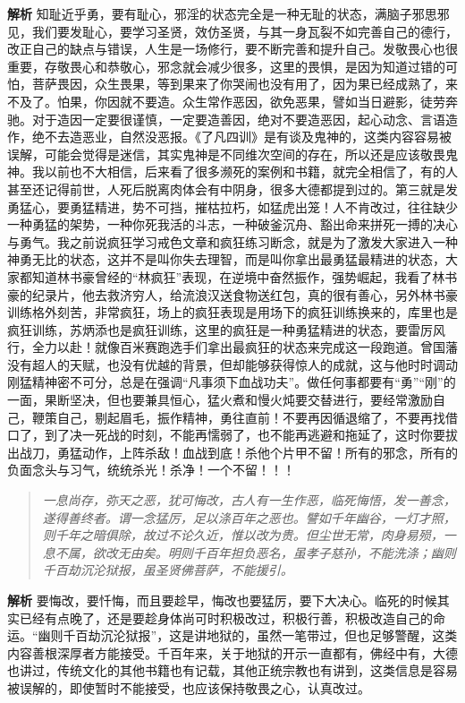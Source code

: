 \textbf{解析} 知耻近乎勇，要有耻心，邪淫的状态完全是一种无耻的状态，满脑子邪思邪见，我们要发耻心，要学习圣贤，效仿圣贤，与其一身瓦裂不如完善自己的德行，改正自己的缺点与错误，人生是一场修行，要不断完善和提升自己。发敬畏心也很重要，存敬畏心和恭敬心，邪念就会减少很多，这里的畏惧，是因为知道过错的可怕，菩萨畏因，众生畏果，等到果来了你哭闹也没有用了，因为果已经成熟了，来不及了。怕果，你因就不要造。众生常作恶因，欲免恶果，譬如当日避影，徒劳奔驰。对于造因一定要很谨慎，一定要造善因，绝对不要造恶因，起心动念、言语造作，绝不去造恶业，自然没恶报。《了凡四训》是有谈及鬼神的，这类内容容易被误解，可能会觉得是迷信，其实鬼神是不同维次空间的存在，所以还是应该敬畏鬼神。我以前也不大相信，后来看了很多濒死的案例和书籍，就完全相信了，有的人甚至还记得前世，人死后脱离肉体会有中阴身，很多大德都提到过的。第三就是发勇猛心，要勇猛精进，势不可挡，摧枯拉朽，如猛虎出笼！人不肯改过，往往缺少一种勇猛的架势，一种你死我活的斗志，一种破釜沉舟、豁出命来拼死一搏的决心与勇气。我之前说疯狂学习戒色文章和疯狂练习断念，就是为了激发大家进入一种神勇无比的状态，这并不是叫你失去理智，而是叫你拿出最勇猛最精进的状态，大家都知道林书豪曾经的“林疯狂”表现，在逆境中奋然振作，强势崛起，我看了林书豪的纪录片，他去救济穷人，给流浪汉送食物送红包，真的很有善心，另外林书豪训练格外刻苦，非常疯狂，场上的疯狂表现是用场下的疯狂训练换来的，库里也是疯狂训练，苏炳添也是疯狂训练，这里的疯狂是一种勇猛精进的状态，要雷厉风行，全力以赴！就像百米赛跑选手们拿出最疯狂的状态来完成这一段跑道。曾国藩没有超人的天赋，也没有优越的背景，但却能够获得惊人的成就，这与他时时调动刚猛精神密不可分，总是在强调“凡事须下血战功夫”。做任何事都要有“勇”“刚”的一面，果断坚决，但也要兼具恒心，猛火煮和慢火炖要交替进行，要经常激励自己，鞭策自己，剔起眉毛，振作精神，勇往直前！不要再因循退缩了，不要再找借口了，到了决一死战的时刻，不能再懦弱了，也不能再逃避和拖延了，这时你要拔出战刀，勇猛动作，上阵杀敌！血战到底！杀他个片甲不留！所有的邪念，所有的负面念头与习气，统统杀光！杀净！一个不留！！！

\begin{quote}\it
    一息尚存，弥天之恶，犹可悔改，古人有一生作恶，临死悔悟，发一善念，遂得善终者。谓一念猛厉，足以涤百年之恶也。譬如千年幽谷，一灯才照，则千年之暗俱除，故过不论久近，惟以改为贵。但尘世无常，肉身易殒，一息不属，欲改无由矣。明则千百年担负恶名，虽孝子慈孙，不能洗涤；幽则千百劫沉沦狱报，虽圣贤佛菩萨，不能援引。
\end{quote}

\textbf{解析} 要悔改，要忏悔，而且要趁早，悔改也要猛厉，要下大决心。临死的时候其实已经有点晚了，还是要趁身体尚可时积极改过，积极行善，积极改造自己的命运。“幽则千百劫沉沦狱报”，这是讲地狱的，虽然一笔带过，但也足够警醒，这类内容善根深厚者方能接受。千百年来，关于地狱的开示一直都有，佛经中有，大德也讲过，传统文化的其他书籍也有记载，其他正统宗教也有讲到，这类信息是容易被误解的，即使暂时不能接受，也应该保持敬畏之心，认真改过。

